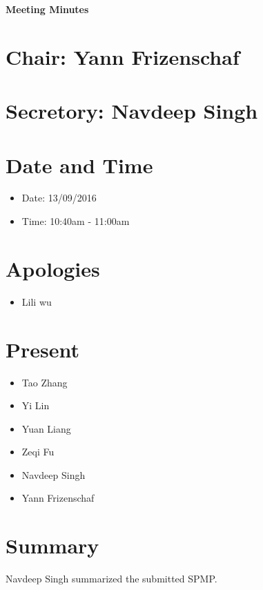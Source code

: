\documentclass[11pt, a4paper]{article}
\begin{document}
\vspace*{15pt}
\begin{center}
\huge \bf Meeting Minutes
\end{center}

\section*{Chair: Yann Frizenschaf}
\section*{Secretory: Navdeep Singh}
\vspace*{10pt}

\section{Date and Time}
\begin{itemize}
\item Date: 13/09/2016
\item Time: 10:40am - 11:00am
\end{itemize}

\section{Apologies}
\begin{itemize}
\item Lili wu
\end{itemize}

\section{Present}
\begin{itemize}
\item Tao Zhang
\item Yi Lin
\item Yuan Liang

\item Zeqi Fu
\item Navdeep Singh
\item Yann Frizenschaf
\end{itemize}



\section{Summary }
Navdeep Singh summarized  the submitted  SPMP.
\end{document}
